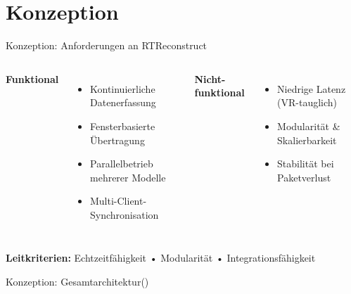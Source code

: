 \section{Konzeption}\sectionFrame

\begin{frame}{Konzeption: Anforderungen an RTReconstruct}{}
    \begin{columns}[T]
        {\large \textbf{Funktional}}
        \begin{itemize}
            \itemsep0.8em
            \item Kontinuierliche Datenerfassung
            \item Fensterbasierte Übertragung
            \item Parallelbetrieb mehrerer Modelle
            \item Multi-Client-Synchronisation
        \end{itemize}
        
        {\large \textbf{Nicht-funktional}}
        \begin{itemize}
            \itemsep0.8em
            \item Niedrige Latenz (VR-tauglich)
            \item Modularität \& Skalierbarkeit
            \item Stabilität bei Paketverlust
        \end{itemize}
    \end{columns}
    
    \vfill
    
    \begin{tcolorbox}[box5, boxsep=0.5em]
        \centering
        \textbf{Leitkriterien:} Echtzeitfähigkeit • Modularität • Integrationsfähigkeit
    \end{tcolorbox}
\end{frame}

\begin{frame}{Konzeption: Gesamtarchitektur}{(\cite{fette2011websocket,10.5555/2600239.2600241})}
    \centering
    
\end{frame}

        
